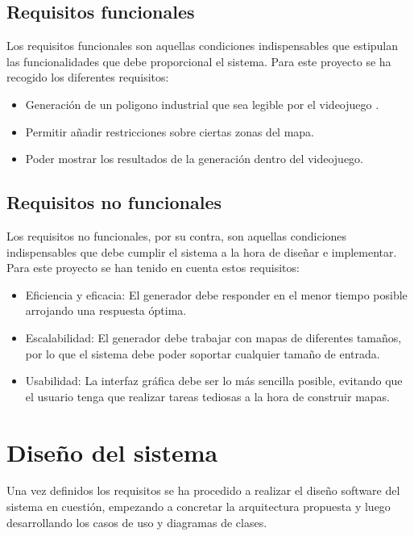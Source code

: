 \subsection{Requisitos funcionales}
\label{subsec:funcrequirements}

Los requisitos funcionales son aquellas condiciones indispensables que estipulan las funcionalidades que debe proporcional el sistema. Para este proyecto se ha recogido los diferentes requisitos:

\begin{itemize}
	\item Generación de un poligono industrial que sea legible por el videojuego \cities.
	\item Permitir añadir restricciones sobre ciertas zonas del mapa.
	\item Poder mostrar los resultados de la generación dentro del videojuego.
\end{itemize}

\subsection{Requisitos no funcionales}

Los requisitos no funcionales, por su contra, son aquellas condiciones indispensables que debe cumplir el sistema a la hora de diseñar e implementar. Para este proyecto se han tenido en cuenta estos requisitos:

\begin{itemize}
	\item Eficiencia y eficacia: El generador debe responder en el menor tiempo posible arrojando una respuesta óptima.
	\item Escalabilidad: El generador debe trabajar con mapas de diferentes tamaños, por lo que el sistema debe poder soportar cualquier tamaño de entrada.
	\item Usabilidad: La interfaz gráfica debe ser lo más sencilla posible, evitando que el usuario tenga que realizar tareas tediosas a la hora de construir mapas.
\end{itemize}

\section{Diseño del sistema}

Una vez definidos los requisitos se ha procedido a realizar el diseño software del sistema en cuestión, empezando a concretar la arquitectura propuesta y luego desarrollando los casos de uso y diagramas de clases.


